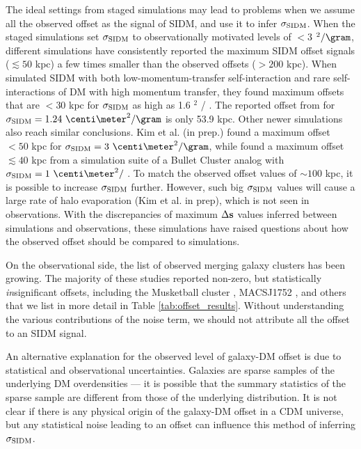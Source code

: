 The ideal settings from staged simulations 
may lead to problems when we assume all the observed offset
as the signal of SIDM, and use it to infer $\sigma_{\rm SIDM}$.  
When the staged simulations set $\sigma_{\rm SIDM}$ to observationally motivated 
levels of $< 3$ \centi\meter$^2 / \gram$, 
different simulations have consistently reported the maximum SIDM offset signals ($\lesssim
50$ kpc) a few times smaller than the observed offsets ($ > 200$ kpc). 
When \cite{Kahlhoefer14} simulated SIDM with both low-momentum-transfer 
self-interaction 
and rare self-interactions of DM with high momentum transfer, they found maximum 
offsets that are $< 30$ kpc for $\sigma_{\rm SIDM}$ as high as 1.6 \centi\meter$^2$ / \gram.
The reported offset from \cite{Randall2008d}
for $\sigmaSIDM = 1.24~\centi\meter^2 / \gram$ is only 53.9 kpc. 
Other newer simulations also reach similar conclusions.
Kim et al. (in prep.) found a maximum offset $< 50$ kpc for 
$\sigmaSIDM = 3~\centi\meter^2 / \gram$, while
\cite{Robertson2016} found a maximum offset $\lesssim 40$ kpc  
 from a simulation suite of a Bullet Cluster analog 
 with $\sigmaSIDM = 1~\centi\meter^2 /$ \gram.
To match the observed offset values of $\sim 100$ kpc, it is possible 
to increase $\sigma_{\rm SIDM}$ further. However, such big $\sigma_{\rm SIDM}$ values will
cause a large rate of halo evaporation (Kim et al. in prep), which is not seen
in observations.
With the discrepancies of maximum $\Delta {\bf s}$ values inferred between simulations 
and observations,
these simulations have raised questions about how the observed offset should be
compared to simulations.

On the observational side, the list of observed merging galaxy 
clusters has been growing.
The majority of these studies reported non-zero,
but statistically {\it in}significant offsets, including the Musketball cluster
\citep{Dawson2013}, MACSJ1752 \citep{Jee2015}, 
and others that we list in more detail in Table \ref{tab:offset_results}.
Without understanding the various contributions of the noise term, 
we should not attribute all the offset to an SIDM signal. 

An alternative explanation for the observed level of galaxy-DM offset is due to 
statistical and observational uncertainties. Galaxies are
sparse samples of the underlying DM overdensities --- it is possible that the 
summary statistics of the sparse sample are different from those of the 
underlying distribution. It is not clear if there is any physical
origin of the galaxy-DM offset in a CDM universe, 
but any statistical noise leading to an offset can influence this method of 
inferring $\sigma_{\rm SIDM}$. 


